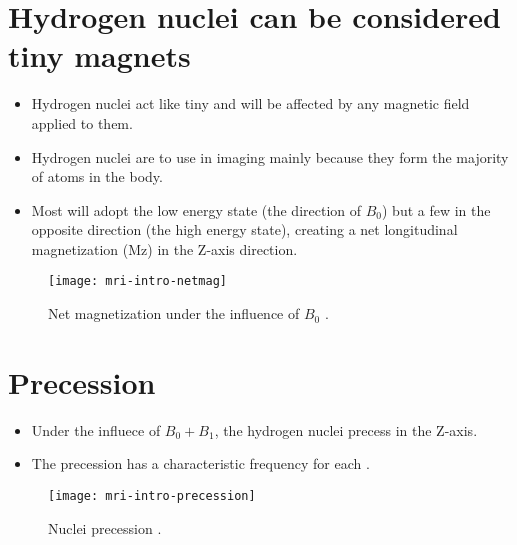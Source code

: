\section{Hydrogen nuclei can be considered tiny magnets}
\begin{itemize}
\item Hydrogen nuclei act like tiny  and will be affected by any magnetic field
  applied to them.
\item Hydrogen nuclei are  to use in imaging mainly because they form the
  majority of atoms in the body.
\item Most will adopt the low energy state (the direction of $B_0$)
  but a few in the opposite direction (the high energy state),
  creating a net longitudinal magnetization (Mz) in the Z-axis
  direction.
\end{itemize}
\vspace{-4ex}
\begin{figure}[!b]
  \centering
  \texttt{[image: mri-intro-netmag]}
  \caption{Net magnetization under the influence of $B_0$ \cite{abdulla2025MRI_intro}.}
  \label{fig:MRI-intro-netmag}
\end{figure}

\section{Precession}
\begin{itemize}
\item Under the influece of $B_0+B_1$, the hydrogen nuclei precess in the Z-axis.
\item The precession has a characteristic 
  frequency for each .
\end{itemize}
\vspace{-4ex}
\begin{figure}[!b]
  \centering
  \texttt{[image: mri-intro-precession]}
  \caption{Nuclei precession \cite{abdulla2025MRI_intro}.}
  \label{fig:MRI-intro-precession}
\end{figure}

